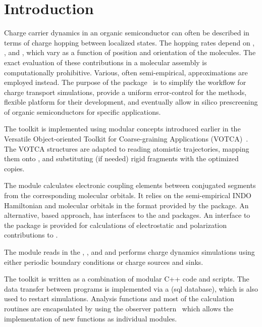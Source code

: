 \chapter{Introduction}
\label{sec:introduction}

Charge carrier dynamics in an organic semiconductor can often be described in terms of charge hopping between localized states. The hopping rates depend on , , and , which vary as a function of position and orientation of the molecules.  The exact evaluation of these contributions in a molecular assembly is computationally prohibitive. Various, often semi-empirical, approximations are employed instead. The purpose of the \votcactp package~\cite{ruhle_microscopic_2011} is to simplify the workflow for charge transport simulations, provide a uniform error-control for the methods, flexible platform for their development, and eventually allow in silico prescreening of organic semiconductors for specific applications. 

The toolkit is implemented using modular concepts introduced earlier in the Versatile Object-oriented Toolkit for Coarse-graining Applications (VOTCA)~\cite{ruhle_versatile_2009}. The VOTCA structures are adapted to reading atomistic trajectories, mapping them onto , and substituting (if needed) rigid fragments with the optimized copies. 

The  module calculates electronic coupling elements between  conjugated segments from the corresponding molecular orbitals. It relies on the semi-empirical INDO Hamiltonian and molecular orbitals in the format provided by the \gaussian package. An alternative,   based approach, has interfaces to the \gaussian and \turbomole packages. An interface to the \tinker package is provided for calculations of electrostatic and polarization contributions to . 

The   module reads in the , , and  and performs charge dynamics simulations using either periodic boundary conditions or charge sources and sinks. 

The toolkit is written as a combination of modular C++ code and scripts. The data transfer between programs is implemented via a  (sql database), which is also used to restart simulations. Analysis functions and most of the calculation routines are encapsulated by using the observer pattern~\cite{gamma_design_1995} which allows the implementation of new functions as individual modules.